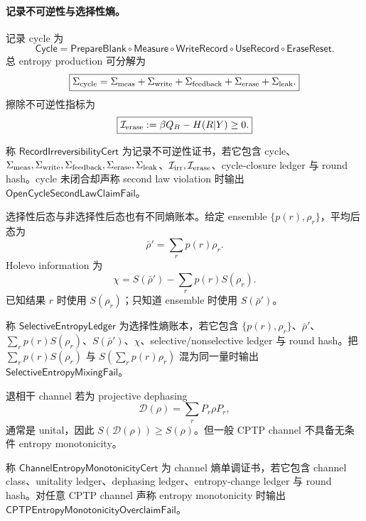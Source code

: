 \paragraph{记录不可逆性与选择性熵。}
记录 cycle 为
\[
\mathsf{Cycle}
=
\mathsf{PrepareBlank}\circ
\mathsf{Measure}\circ
\mathsf{WriteRecord}\circ
\mathsf{UseRecord}\circ
\mathsf{EraseReset}.
\]
总 entropy production 可分解为
\[
\boxed{
\Sigma_{\rm cycle}
=
\Sigma_{\rm meas}
+\Sigma_{\rm write}
+\Sigma_{\rm feedback}
+\Sigma_{\rm erase}
+\Sigma_{\rm leak}.
}
\]
擦除不可逆性指标为
\[
\boxed{
\mathcal I_{\rm erase}:=\beta Q_B-H(R|Y)\ge0.
}
\]

\begin{definition}[记录不可逆性证书]\label{def:typed-address-biaxial-completion-record-irreversibility-cert}
称 \(\mathsf{RecordIrreversibilityCert}\) 为记录不可逆性证书，若它包含 cycle、\(\Sigma_{\rm meas},\Sigma_{\rm write},\Sigma_{\rm feedback},\Sigma_{\rm erase},\Sigma_{\rm leak}\)、\(\mathcal I_{\rm irr},\mathcal I_{\rm erase}\)、cycle-closure ledger 与 round hash。cycle 未闭合却声称 second law violation 时输出 \(\mathsf{OpenCycleSecondLawClaimFail}\)。
\end{definition}

选择性后态与非选择性后态也有不同熵账本。给定 ensemble \(\{p(r),\rho_r\}\)，平均后态为
\[
\bar\rho'=\sum_rp(r)\rho_r.
\]
Holevo information 为
\[
\boxed{
\chi=S(\bar\rho')-\sum_rp(r)S(\rho_r).
}
\]
已知结果 \(r\) 时使用 \(S(\rho_r)\)；只知道 ensemble 时使用 \(S(\bar\rho')\)。

\begin{definition}[选择性熵账本]\label{def:typed-address-biaxial-completion-selective-entropy-ledger}
称 \(\mathsf{SelectiveEntropyLedger}\) 为选择性熵账本，若它包含 \(\{p(r),\rho_r\}\)、\(\bar\rho'\)、\(\sum_rp(r)S(\rho_r)\)、\(S(\bar\rho')\)、\(\chi\)、selective/nonselective ledger 与 round hash。把 \(\sum_rp(r)S(\rho_r)\) 与 \(S(\sum_rp(r)\rho_r)\) 混为同一量时输出 \(\mathsf{SelectiveEntropyMixingFail}\)。
\end{definition}

退相干 channel 若为 projective dephasing
\[
\mathcal D(\rho)=\sum_rP_r\rho P_r,
\]
通常是 unital，因此 \(S(\mathcal D(\rho))\ge S(\rho)\)。但一般 CPTP channel 不具备无条件 entropy monotonicity。

\begin{definition}\label{def:typed-address-biaxial-completion-channel-entropy-monotonicity-cert}
称 \(\mathsf{ChannelEntropyMonotonicityCert}\) 为 channel 熵单调证书，若它包含 channel class、unitality ledger、dephasing ledger、entropy-change ledger 与 round hash。对任意 CPTP channel 声称 entropy monotonicity 时输出 \(\mathsf{CPTPEntropyMonotonicityOverclaimFail}\)。
\end{definition}

